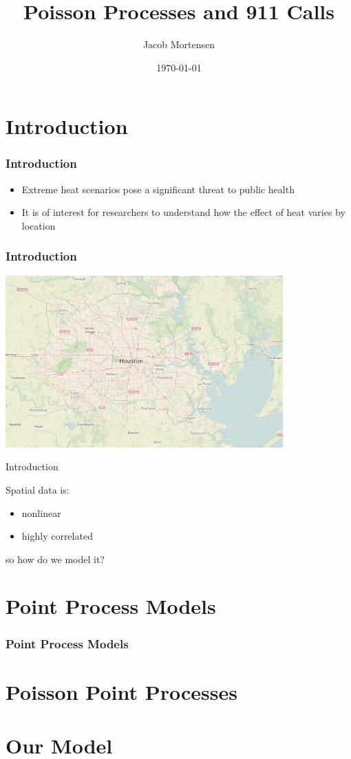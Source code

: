 \documentclass[10pt, compress]{beamer}
\title{Poisson Processes and 911 Calls}
\subtitle{}
\date{\today}
\author{Jacob Mortensen}
\institute{Brigham Young University}
\begin{document}
  \maketitle
  
  \section{Introduction}
  \begin{frame}
    \frametitle{Introduction}
    \begin{itemize}
      \item Extreme heat scenarios pose a significant threat to public health
      \item It is of interest for researchers to understand how the effect of heat varies by location
    \end{itemize}
  \end{frame}
  \begin{frame}
    \frametitle{Introduction}
    \centering
    \includegraphics[width=0.8\textwidth]{houston_map.jpg}
  \end{frame}
  \begin{frame}{Introduction}
    \centering
    \begin{minipage}{0.8\textwidth}
      Spatial data is:
      \begin{itemize}
        \item nonlinear
        \item highly correlated
      \end{itemize}
    so how do we model it?
    \end{minipage}
  \end{frame}
  \section{Point Process Models}
  \begin{frame}
    \frametitle{Point Process Models}
    
  \end{frame}
  \section{Poisson Point Processes}

  \section{Our Model}

  
\end{document}
